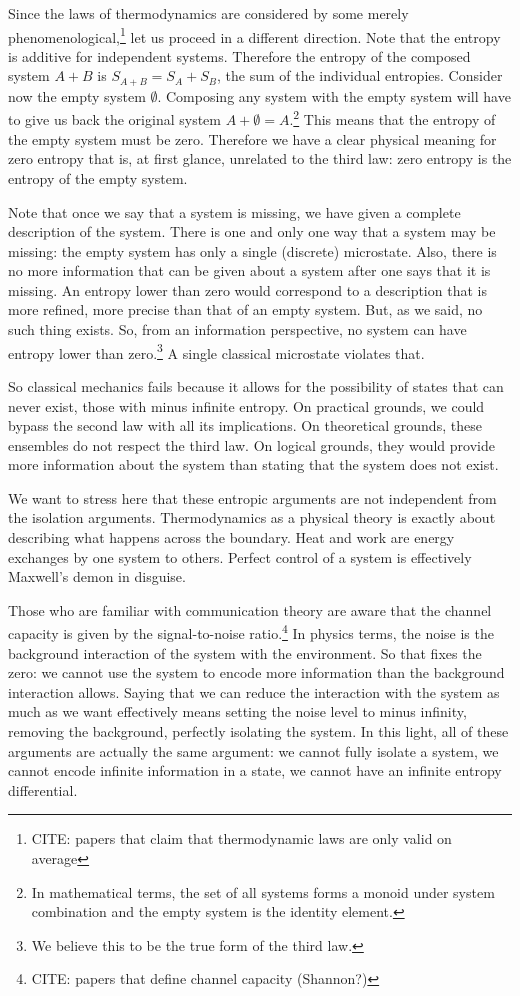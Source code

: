 \documentclass[10pt,twocolumn, nofootinbib]{revtex4-2}
\begin{document}
Since the laws of thermodynamics are considered by some merely phenomenological,\footnote{CITE: papers that claim that thermodynamic laws are only valid on average} let us proceed in a different direction. Note that the entropy is additive for independent systems. Therefore the entropy of the composed system $A+B$ is $S_{A+B} = S_A + S_B$, the sum of the individual entropies. Consider now the empty system $\emptyset$. Composing any system with the empty system will have to give us back the original system $A+\emptyset = A$.\footnote{In mathematical terms, the set of all systems forms a monoid under system combination and the empty system is the identity element.} This means that the entropy of the empty system must be zero. Therefore we have a clear physical meaning for zero entropy that is, at first glance, unrelated to the third law: zero entropy is the entropy of the empty system.

Note that once we say that a system is missing, we have given a complete description of the system. There is one and only one way that a system may be missing: the empty system has only a single (discrete) microstate. Also, there is no more information that can be given about a system after one says that it is missing. An entropy lower than zero would correspond to a description that is more refined, more precise than that of an empty system. But, as we said, no such thing exists. So, from an information perspective, no system can have entropy lower than zero.\footnote{We believe this to be the true form of the third law.} A single classical microstate violates that.

So classical mechanics fails because it allows for the possibility of states that can never exist, those with minus infinite entropy. On practical grounds, we could bypass the second law with all its implications. On theoretical grounds, these ensembles do not respect the third law. On logical grounds, they would provide more information about the system than stating that the system does not exist.

We want to stress here that these entropic arguments are not independent from the isolation arguments. Thermodynamics as a physical theory is exactly about describing what happens across the boundary. Heat and work are energy exchanges by one system to others. Perfect control of a system is effectively Maxwell’s demon in disguise.

Those who are familiar with communication theory are aware that the channel capacity is given by the signal-to-noise ratio.\footnote{CITE: papers that define channel capacity (Shannon?)} In physics terms, the noise is the background interaction of the system with the environment. So that fixes the zero: we cannot use the system to encode more information than the background interaction allows. Saying that we can reduce the interaction with the system as much as we want effectively means setting the noise level to minus infinity, removing the background, perfectly isolating the system. In this light, all of these arguments are actually the same argument: we cannot fully isolate a system, we cannot encode infinite information in a state, we cannot have an infinite entropy differential.
\end{document}
